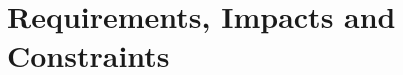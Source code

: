 \documentclass[12pt]{report}
\begin{document}
\chapter{Requirements, Impacts and Constraints}

\end{document}
